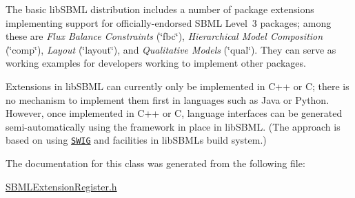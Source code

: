 The basic lib\+S\+B\+ML distribution includes a number of package extensions implementing support for officially-\/endorsed S\+B\+ML Level~3 packages; among these are {\itshape Flux Balance Constraints} (\char`\"{}fbc\char`\"{}), {\itshape Hierarchical Model Composition} (\char`\"{}comp\char`\"{}), {\itshape Layout} (\char`\"{}layout\char`\"{}), and {\itshape Qualitative Models} (\char`\"{}qual\char`\"{}). They can serve as working examples for developers working to implement other packages.

Extensions in lib\+S\+B\+ML can currently only be implemented in C++ or C; there is no mechanism to implement them first in languages such as Java or Python. However, once implemented in C++ or C, language interfaces can be generated semi-\/automatically using the framework in place in lib\+S\+B\+ML. (The approach is based on using \href{http://www.swig.org}{\tt S\+W\+IG} and facilities in lib\+S\+B\+ML\textquotesingle{}s build system.) 

The documentation for this class was generated from the following file\+:\begin{DoxyCompactItemize}
\item 
\hyperlink{_s_b_m_l_extension_register_8h}{S\+B\+M\+L\+Extension\+Register.\+h}\end{DoxyCompactItemize}
